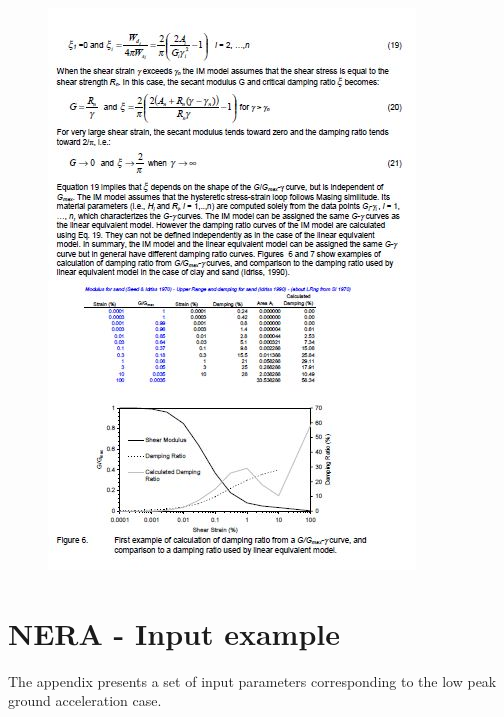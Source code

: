 \documentclass[12pt,a4paper]{report}
\begin{document}
\begin{figure}[h!]
	\centering
	\includegraphics[width=1\linewidth]{"NERA5"}
	\label{Nera5}
\end{figure}

\chapter{NERA - Input example} \label{Input_NERA}
The appendix presents a set of input parameters corresponding to the low peak ground acceleration case.
\end{document}
